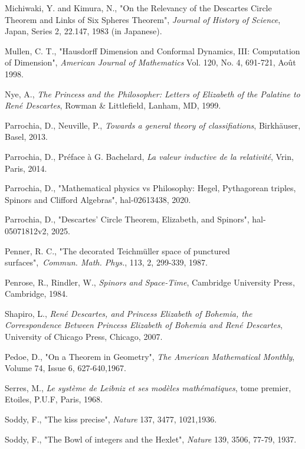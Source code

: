 \documentclass[12pt]{article}
\theoremstyle{définition}
\theoremstyle{remark}
\theoremstyle{plain}
\theoremstyle{plain}
\begin{document}
\begin{thebibliography}{}
 Michiwaki, Y. and Kimura, N., "On the Relevancy of the Descartes Circle Theorem and Links of Six Spheres Theorem", {\it Journal of History of Science}, Japan, Series 2, 22.147, 1983 (in Japanese).

 Mullen, C. T., "Hausdorff Dimension and Conformal Dynamics, III: Computation of Dimension", {\it American Journal of Mathematics}
Vol. 120, No. 4, 691-721, Août 1998.

 Nye, A., {\it The Princess and the Philosopher: Letters of Elizabeth of the Palatine to René Descartes}, Rowman \& Littlefield, Lanham, MD, 1999.

 Parrochia, D., Neuville, P., {\it Towards a general theory of classifiations}, Birkhäuser, Basel, 2013.

 Parrochia, D., Préface à G. Bachelard, {\it La valeur inductive de la relativité}, Vrin, Paris, 2014.

 Parrochia, D., "Mathematical physics vs Philosophy: Hegel, Pythagorean triples, Spinors and Clifford Algebras", hal-02613438, 2020.

 Parrochia, D., "Descartes’ Circle Theorem, Elizabeth, and Spinors", hal-05071812v2, 2025.

 Penner, R. C., "The decorated Teichmüller space of punctured surfaces", {\it Commun. Math. Phys.}, 113, 2, 299-339, 1987.

 Penrose, R., Rindler, W., {\it Spinors and Space-Time}, Cambridge University Press, Cambridge, 1984.

 Shapiro, L., {\it René Descartes, and Princess Elizabeth of Bohemia, the Correspondence Between Princess Elizabeth of Bohemia and René Descartes},
University of Chicago Press, Chicago, 2007.

 Pedoe, D., "On a Theorem in Geometry", {\it The American Mathematical Monthly},
Volume 74, Issue 6, 627-640,1967.

 Serres, M., {\it Le système de Leibniz et ses modèles mathématiques}, tome premier, Etoiles, P.U.F, Paris, 1968.

 Soddy, F., "The kiss precise", {\it Nature} 137, 3477, 1021,1936.

 Soddy, F., "The Bowl of integers and the Hexlet", {\it Nature} 139, 3506, 77-79, 1937.


\end{thebibliography}
\end{document}
